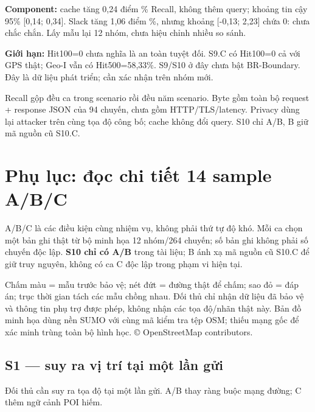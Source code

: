 \documentclass[10pt,a4paper]{article}
\begin{document}
\textbf{Component:} cache tăng 0,24 điểm \% Recall, không thêm query; khoảng tin cậy 95\% [0,14; 0,34]. Slack tăng 1,06 điểm \%, nhưng khoảng [-0,13; 2,23] chứa 0: chưa chắc chắn. Lấy mẫu lại 12 nhóm, chưa hiệu chỉnh nhiều so sánh.

\textbf{Giới hạn:} Hit100=0 chưa nghĩa là an toàn tuyệt đối. S9.C có Hit100=0 cả với GPS thật; Geo-I vẫn có Hit500=58,33\%. S9/S10 ở đây chưa bật BR-Boundary. Đây là dữ liệu phát triển; cần xác nhận trên nhóm mới.

Recall gộp đều ca trong scenario rồi đều năm scenario. Byte gồm toàn bộ request + response JSON của 94 chuyến, chưa gồm HTTP/TLS/latency. Privacy dùng lại attacker trên cùng tọa độ công bố; cache không đổi query. S10 chỉ A/B, B giữ mã nguồn cũ S10.C.


\clearpage
\section{Phụ lục: đọc chi tiết 14 sample A/B/C}\label{sec:4}
A/B/C là các điều kiện cùng nhiệm vụ, không phải thứ tự độ khó. Mỗi ca chọn một bản ghi thật từ bộ minh họa 12 nhóm/264 chuyến; số bản ghi không phải số chuyến độc lập. \textbf{S10 chỉ có A/B} trong tài liệu; B ánh xạ mã nguồn cũ S10.C để giữ truy nguyên, không có ca C độc lập trong phạm vi hiện tại.

Chấm màu = mẫu trước bảo vệ; nét đứt = đường thật để chấm; sao đỏ = đáp án; trục thời gian tách các mẫu chồng nhau. Đối thủ chỉ nhận dữ liệu đã bảo vệ và thông tin phụ trợ được phép, không nhận các tọa độ/nhãn thật này. Bản đồ minh họa dùng nền SUMO với cùng mã kiểm tra tệp OSM; thiếu mạng gốc để xác minh trùng toàn bộ hình học. © OpenStreetMap contributors.

\subsection{S1 — suy ra vị trí tại một lần gửi}\label{sub:4.1}
Đối thủ cần suy ra tọa độ tại một lần gửi. A/B thay ràng buộc mạng đường; C thêm ngữ cảnh POI hiếm.
\end{document}
